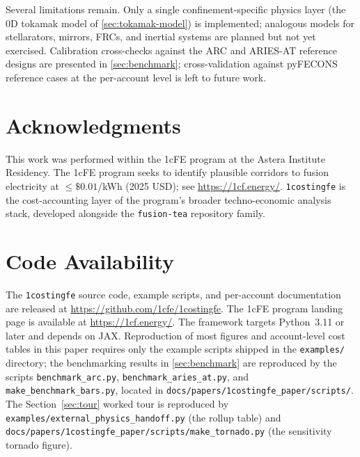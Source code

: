 \documentclass{article}
\begin{document}
Several limitations remain. Only a single confinement-specific physics
layer (the 0D tokamak model of \cref{sec:tokamak-model}) is implemented;
analogous models for stellarators, mirrors, FRCs, and inertial systems
are planned but not yet exercised. Calibration cross-checks
against the ARC and ARIES-AT reference designs are presented in
\cref{sec:benchmark}; cross-validation against pyFECONS reference cases
at the per-account level is left to future work.
\section*{Acknowledgments}

This work was performed within the 1cFE program at the Astera
Institute Residency. The 1cFE program seeks to identify plausible
corridors to fusion electricity at $\le \$0.01$/kWh (2025 USD); see
\url{https://1cf.energy/}. \texttt{1costingfe} is the cost-accounting
layer of the program's broader techno-economic analysis stack,
developed alongside the \texttt{fusion-tea} repository family.

\section{Code Availability}
\label{sec:code-availability}

The \texttt{1costingfe} source code, example scripts, and per-account
documentation are released at
\url{https://github.com/1cfe/1costingfe}. The 1cFE program landing
page is available at \url{https://1cf.energy/}. The framework targets
Python~3.11 or later and depends on JAX. Reproduction of most figures
and account-level cost tables in this paper requires only the example
scripts shipped in the \texttt{examples/} directory; the benchmarking
results in \cref{sec:benchmark} are reproduced by the scripts
\texttt{benchmark\_arc.py}, \texttt{benchmark\_aries\_at.py}, and
\texttt{make\_benchmark\_bars.py}, located in
\texttt{docs/papers/1costingfe\_paper/scripts/}.
The Section~\ref{sec:tour} worked tour is reproduced by
\texttt{examples/external\_physics\_handoff.py} (the rollup table)
and \texttt{docs/papers/1costingfe\_paper/scripts/make\_tornado.py}
(the sensitivity tornado figure).



\appendix
\end{document}
